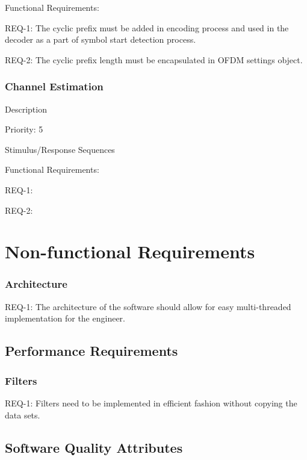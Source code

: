 \documentclass[]{report}
\begin{document}
Functional Requirements:\par
REQ-1: The cyclic prefix must be added in encoding process and used in the decoder as a part of symbol start detection process. \par 
REQ-2: The cyclic prefix length must be encapsulated in OFDM settings object. \par


\subsubsection{Channel Estimation}

Description \par
\par

Priority: 5  \par

Stimulus/Response Sequences \par

Functional Requirements: \par
REQ-1:  \par 
REQ-2:  \par


\pagebreak
\section{Non-functional Requirements}

\subsubsection{Architecture}

REQ-1: The architecture of the software should allow for easy multi-threaded implementation for the engineer. \par

\subsection{Performance Requirements}



\subsubsection{Filters}

REQ-1: Filters need to be implemented in efficient fashion without copying the data sets. \par


\subsection{Software Quality Attributes}
\end{document}
